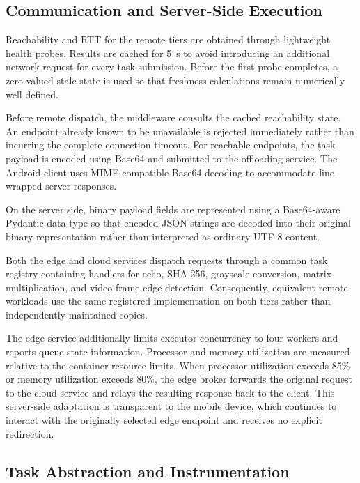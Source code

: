 \subsection{Communication and Server-Side Execution}
\label{subsec:communication_server}

Reachability and RTT for the remote tiers are obtained through lightweight
health probes. Results are cached for 5~s to avoid introducing an additional
network request for every task submission. Before the first probe completes,
a zero-valued stale state is used so that freshness calculations remain
numerically well defined.

Before remote dispatch, the middleware consults the cached reachability state.
An endpoint already known to be unavailable is rejected immediately rather
than incurring the complete connection timeout. For reachable endpoints, the
task payload is encoded using Base64 and submitted to the offloading service.
The Android client uses MIME-compatible Base64 decoding to accommodate
line-wrapped server responses.

On the server side, binary payload fields are represented using a Base64-aware
Pydantic data type so that encoded JSON strings are decoded into their original
binary representation rather than interpreted as ordinary UTF-8 content.

Both the edge and cloud services dispatch requests through a common task
registry containing handlers for echo, SHA-256, grayscale conversion, matrix
multiplication, and video-frame edge detection. Consequently, equivalent
remote workloads use the same registered implementation on both tiers rather
than independently maintained copies.

The edge service additionally limits executor concurrency to four workers and
reports queue-state information. Processor and memory utilization are measured
relative to the container resource limits. When processor utilization exceeds
85\% or memory utilization exceeds 80\%, the edge broker forwards the original
request to the cloud service and relays the resulting response back to the
client. This server-side adaptation is transparent to the mobile device, which
continues to interact with the originally selected edge endpoint and receives no
explicit redirection.


\subsection{Task Abstraction and Instrumentation}
\label{subsec:task_instrumentation}

